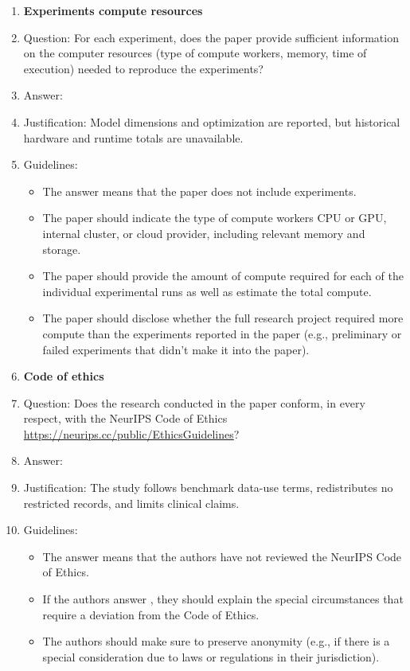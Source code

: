 \documentclass{article}
\begin{document}
\begin{enumerate}
\item {\bf Experiments compute resources}
    \item[] Question: For each experiment, does the paper provide sufficient information on the computer resources (type of compute workers, memory, time of execution) needed to reproduce the experiments?
    \item[] Answer: \answerNo{}
    \item[] Justification: Model dimensions and optimization are reported, but historical hardware and runtime totals are unavailable.
    \item[] Guidelines:
    \begin{itemize}
        \item The answer \answerNA{} means that the paper does not include experiments.
        \item The paper should indicate the type of compute workers CPU or GPU, internal cluster, or cloud provider, including relevant memory and storage.
        \item The paper should provide the amount of compute required for each of the individual experimental runs as well as estimate the total compute. 
        \item The paper should disclose whether the full research project required more compute than the experiments reported in the paper (e.g., preliminary or failed experiments that didn't make it into the paper). 
    \end{itemize}
    
\item {\bf Code of ethics}
    \item[] Question: Does the research conducted in the paper conform, in every respect, with the NeurIPS Code of Ethics \url{https://neurips.cc/public/EthicsGuidelines}?
    \item[] Answer: \answerYes{}
    \item[] Justification: The study follows benchmark data-use terms, redistributes no restricted records, and limits clinical claims.
    \item[] Guidelines:
    \begin{itemize}
        \item The answer \answerNA{} means that the authors have not reviewed the NeurIPS Code of Ethics.
        \item If the authors answer \answerNo, they should explain the special circumstances that require a deviation from the Code of Ethics.
        \item The authors should make sure to preserve anonymity (e.g., if there is a special consideration due to laws or regulations in their jurisdiction).
    \end{itemize}



\end{enumerate}
\end{document}
